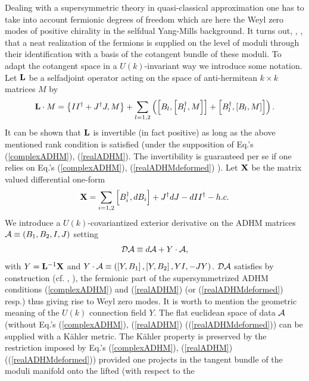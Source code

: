 \documentclass[a4paper,12pt]{article}
\begin{document}
Dealing with a supersymmetric theory in quasi-classical
approximation one has to take into account fermionic degrees of
freedom which are here the Weyl zero modes of positive chirality
in the selfdual Yang-Mills background. It turns out, \cite{FPS1},
\cite{FPS2}, that a neat realization of the fermions is supplied
on the level of moduli through their identification with a basis
of the cotangent bundle of these moduli. To adapt the cotangent
space in a $U(k)$-invariant way we introduce some notation. Let
${\bf L}$ be a selfadjoint operator acting on the space of
anti-hermitean $k \times k$ matrices $M$ by
\begin{eqnarray}
{\bf L}\cdot M=\left\{ II^{\dagger}+J^{\dagger}J,M
\right\}+\sum_{l=1,2}\left( \left[B_l, \left[B_l^{\dagger}, M
\right]\right]+\left[B_l^{\dagger}, \left[B_l, M\right]
\right]\right).
\end{eqnarray}
It can be shown that ${\bf L}$ is invertible (in fact positive) as
long as the above mentioned rank condition is satisfied (under the
supposition of Eq.'s (\ref{complexADHM}), (\ref{realADHM}). The
invertibility is guaranteed per se if one relies on Eq.'s
(\ref{complexADHM}), (\ref{realADHMdeformed}) ). Let ${\bf X}$ be
the matrix valued differential one-form
\begin{eqnarray}
{\bf X}=\sum_{i=1,2}\left[B_i^{\dagger},dB_i\right]+J^{\dagger}dJ-dII^{\dagger}-h.c.
\end{eqnarray}
We introduce a $U(k)$-covariantized exterior derivative on the ADHM matrices ${\cal A}\equiv (B_1, B_2, I, J)$
setting
\begin{eqnarray}
{\cal D}{\cal A}\equiv d{\cal A}+Y\cdot {\cal A},
\label{covderivative}
\end{eqnarray}
with $Y={\bf L}^{-1}{\bf X}$ and $Y\cdot {\cal A}\equiv
(\left[Y,B_1\right], \left[Y,B_2\right], YI, -JY)$. ${\cal D}{\cal
A}$ satisfies by construction (cf. \cite{FPS1}, \cite{FPS2}), the
fermionic part of the supersymmetrized ADHM conditions
(\ref{complexADHM}) and (\ref{realADHM}) (or
(\ref{realADHMdeformed}) resp.) thus giving rise to Weyl zero
modes. It is worth to mention the geometric meaning of the $U(k)$
connection field $Y$. The flat euclidean space of data ${\cal A}$
(without Eq.'s (\ref{complexADHM}), (\ref{realADHM})
((\ref{realADHMdeformed})) can be supplied with a K\"{a}hler
metric. The K\"{a}hler property is preserved by the restriction
imposed by Eq.'s (\ref{complexADHM}), (\ref{realADHM})
((\ref{realADHMdeformed})) provided one projects in the tangent
bundle of the moduli manifold onto the lifted (with respect to the
\end{document}
